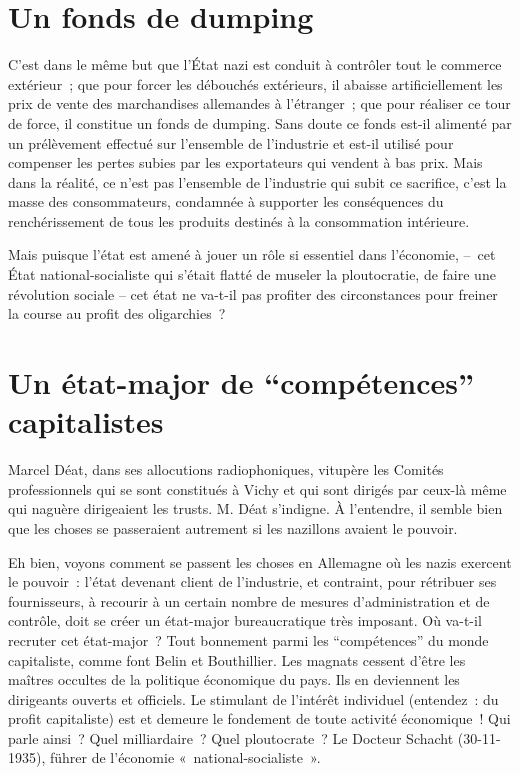 \documentclass[french,twoside]{book} %
\begin{document}
\section[Un fonds de dumping]{Un fonds de dumping}
\noindent C’est dans le même but que l’État nazi est conduit à contrôler tout le commerce extérieur ; que pour forcer les débouchés extérieurs, il abaisse artificiellement les prix de vente des marchandises allemandes à l’étranger ; que pour réaliser ce tour de force, il constitue un fonds de dumping. Sans doute ce fonds est-il alimenté par un prélèvement effectué sur l’ensemble de l’industrie et est-il utilisé pour compenser les pertes subies par les exportateurs qui vendent à bas prix. Mais dans la réalité, ce n’est pas l’ensemble de l’industrie qui subit ce sacrifice, c’est la masse des consommateurs, condamnée à supporter les conséquences du renchérissement de tous les produits destinés à la consommation intérieure.\par
Mais puisque l’état est amené à jouer un rôle si essentiel dans l’économie, – cet État national-socialiste qui s’était flatté de museler la ploutocratie, de faire une révolution sociale – cet état ne va-t-il pas profiter des circonstances pour freiner la course au profit des oligarchies ?
\section[Un état-major de “compétences” capitalistes]{Un état-major de “compétences” capitalistes}
\noindent Marcel Déat, dans ses allocutions radiophoniques, vitupère les Comités professionnels qui se sont constitués à Vichy et qui sont dirigés par ceux-là même qui naguère dirigeaient les trusts. M. Déat s’indigne. À l’entendre, il semble bien que les choses se passeraient autrement si les nazillons avaient le pouvoir.\par
Eh bien, voyons comment se passent les choses en Allemagne où les nazis exercent le pouvoir : l’état devenant client de l’industrie, et contraint, pour rétribuer ses fournisseurs, à recourir à un certain nombre de mesures d’administration et de contrôle, doit se créer un état-major bureaucratique très imposant. Où va-t-il recruter cet état-major ? Tout bonnement parmi les “compétences” du monde capitaliste, comme font Belin et Bouthillier. Les magnats cessent d’être les maîtres occultes de la politique économique du pays. Ils en deviennent les dirigeants ouverts et officiels. Le stimulant de l’intérêt individuel (entendez : du profit capitaliste) est et demeure le fondement de toute activité économique ! Qui parle ainsi ? Quel milliardaire ? Quel ploutocrate ? Le Docteur Schacht (30-11-1935), führer de l’économie « national-socialiste ».
\end{document}
